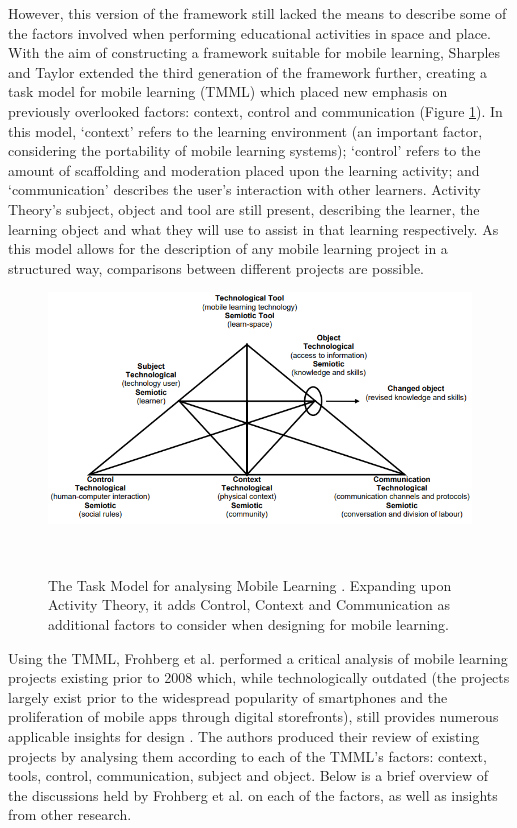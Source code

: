 However, this version of the framework still lacked the means to describe some of the factors involved when performing educational activities in space and place. With the aim of constructing a framework suitable for mobile learning, Sharples and Taylor extended the third generation of the framework further, creating a task model for mobile learning (TMML) which placed new emphasis on previously overlooked factors: context, control and communication \citep{Sharples2007,Taylor2006} (Figure \ref{fig:taskModelMLearning}). In this model, `context' refers to the learning environment (an important factor, considering the portability of mobile learning systems); `control' refers to the amount of scaffolding and moderation placed upon the learning activity; and `communication' describes the user’s interaction with other learners. Activity Theory’s subject, object and tool are still present, describing the learner, the learning object and what they will use to assist in that learning respectively. As this model allows for the description of any mobile learning project in a structured way, comparisons between different projects are possible.

\begin{figure}
\centering
  \includegraphics[width=1\columnwidth]{images/chapter03/taskModelForMobileLearning.PNG}
  \caption[The Task Model for Mobile Learning]{ The Task Model for analysing Mobile Learning \citep{Taylor2006}. Expanding upon Activity Theory, it adds Control, Context and Communication as additional factors to consider when designing for mobile learning.}~\label{fig:taskModelMLearning}
\end{figure}

Using the TMML, Frohberg et al. performed a critical analysis of mobile learning projects existing prior to 2008 which, while technologically outdated (the projects largely exist prior to the widespread popularity of smartphones and the proliferation of mobile apps through digital storefronts), still provides numerous applicable insights for design \citep{Frohberg2009}. The authors produced their review of existing projects by analysing them according to each of the TMML's factors: context, tools, control, communication, subject and object. Below is a brief overview of the discussions held by Frohberg et al. on each of the factors, as well as insights from other research.


